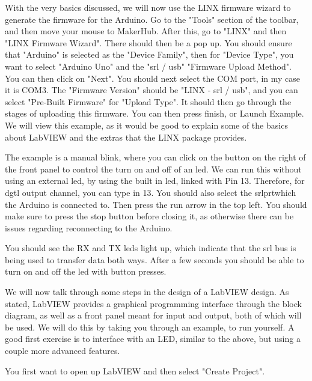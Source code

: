 \documentclass[a4paper,11pt]{report}
\begin{document}
With the very basics discussed, we will now use the LINX firmware wizard to generate the firmware for the Arduino. Go to the "Tools" section of the toolbar, and then move your mouse to MakerHub. After this, go to "LINX" and then "LINX Firmware Wizard". There should then be a pop up. You should ensure that "Arduino" is selected as the "Device Family", then for "Device Type", you want to select "Arduino Uno" and the "\gls{srl} / \gls{usb}" "Firmware Upload Method". You can then click on "Next". You should next select the COM port, in my case it is COM3. The "Firmware Version" should be "LINX - \gls{srl} / \gls{usb}", and you can select "Pre-Built Firmware" for "Upload Type". It should then go through the stages of uploading this firmware. You can then press finish, or Launch Example. We will view this example, as it would be good to explain some of the basics about LabVIEW and the extras that the LINX package provides.

The example is a manual blink, where you can click on the button on the right of the front panel to control the turn on and off of an \gls{led}. We can run this without using an external \gls{led}, by using the built in \gls{led}, linked with Pin 13. Therefore, for \gls{dgtl} output channel, you can type in 13. You should also select the \gls{srl}\gls{prt}which the Arduino is connected to. Then press the run arrow in the top left. You should make sure to press the stop button before closing it, as otherwise there can be issues regarding reconnecting to the Arduino.

You should see the RX and TX \gls{led}s light up, which indicate that the \gls{srl} bus is being used to transfer data both ways. After a few seconds you should be able to turn on and off the \gls{led} with button presses.



We will now talk through some steps in the design of a LabVIEW design. As stated, LabVIEW provides a graphical programming interface through the block diagram, as well as a front panel meant for input and output, both of which will be used. We will do this by taking you through an example, to run yourself. A good first exercise is to interface with an LED, similar to the above, but using a couple more advanced features.

You first want to open up LabVIEW and then select "Create Project".
\end{document}
